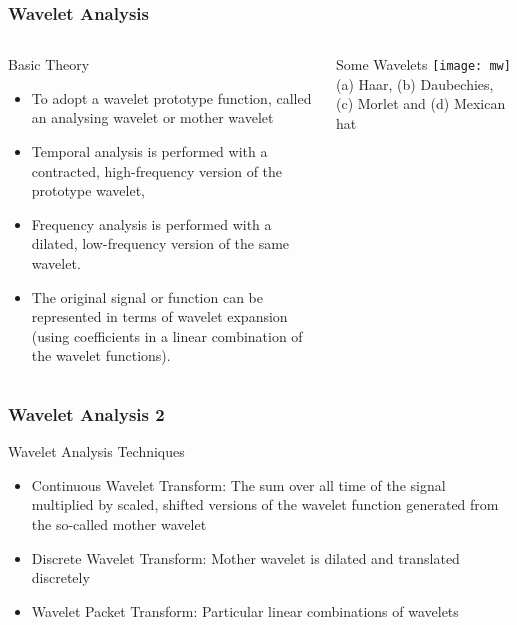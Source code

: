 \documentclass[9pt]{beamer}
\begin{document}
\begin{frame}
\frametitle{Wavelet Analysis}

\begin{columns}
\begin{block}{Basic Theory}
    \begin{itemize}
    \item To adopt a wavelet prototype function, called an analysing wavelet or \alert{mother wavelet}
    \item Temporal analysis is performed with a contracted, high-frequency version of the prototype wavelet, 
    \item Frequency analysis is performed with a dilated, low-frequency version of the same wavelet.
    \item The original signal or function can be represented in terms of wavelet expansion (using coefficients in a linear combination of the wavelet functions).
    \end{itemize}
\end{block}
\begin{block}{Some Wavelets}
\texttt{[image: mw]}
(a) Haar, (b) Daubechies, (c) Morlet and (d) Mexican hat
\end{block}
\end{columns}
\end{frame}

\begin{frame}
\frametitle{Wavelet Analysis \hfill{2}}
\begin{block}{Wavelet Analysis Techniques}
    \begin{itemize}
    \item \alert{Continuous Wavelet Transform}: The sum over all time of the signal multiplied by scaled, shifted versions of the wavelet function generated from the so-called mother wavelet
    \item \alert{Discrete Wavelet Transform}: Mother wavelet is dilated and translated discretely
    \item \alert{Wavelet Packet Transform}: Particular linear combinations of wavelets
    \end{itemize}
\end{block}
\end{frame}
\end{document}
